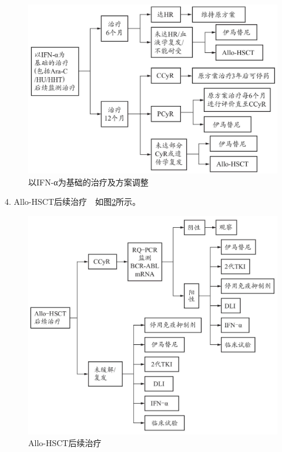 \begin{figure}[!htbp]
 \centering
 \includegraphics{./images/Image00138.jpg}
 \captionsetup{justification=centering}
 \caption{以IFN-α为基础的治疗及方案调整}
 \label{fig5-1-5}
  \end{figure} 

4. Allo-HSCT后续治疗　如图\ref{fig5-1-6}所示。

\begin{figure}[!htbp]
 \centering
 \includegraphics{./images/Image00139.jpg}
 \captionsetup{justification=centering}
 \caption{Allo-HSCT后续治疗}
 \label{fig5-1-6}
  \end{figure} 

